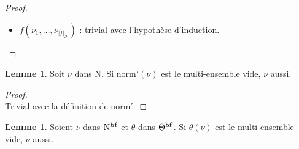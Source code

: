 \documentclass[a4paper]{report}
\newenvironment{preuve} 
  {\begin{proof}~\\} 
  {\end{proof}}
\theoremstyle{definition}
\newtheorem{lemme}[theoreme]{Lemme}
\newcommand{\norm}{\mathrm{norm}}
\newcommand{\F}{\mathscr{F}}
\newcommand{\N}{\mathrm{N}}
\begin{document}
\begin{preuve}
\begin{itemize}[label={\textbf{Cas}}]
      Par hypothèse d'induction, $\hat\theta (\nu)$ est bien formée.
      \begin{itemize}[label={\textbf{Si}}]
        \item
          $\hat\theta (\nu) = {\nu^\#}' \rightarrow \nu'$ : \\
          $\hat\theta (\nu^\#)$ étant bien formé, ${\nu^\#}'$ est presque bien formé, $\nu'$ est bien formé et n'est pas une flèche. \\
          Par le lemme \ref{pbf_implique_msomme_pbf}, la somme de $\hat\theta (\nu^\#)$ et ${\nu^\#}'$ est presque bien formée. \\
          On en déduit le résultat attendu.
        \item
          non : trivial.
      \end{itemize}
    \item
      $f (\nu_1, \dots, \nu_{|f|_\F})$ : trivial avec l'hypothèse d'induction.
  \end{itemize}
\end{preuve}

\begin{lemme} \label{norm'_vide_implique_vide}
  Soit $\nu$ dans $\N$. Si $\norm' (\nu)$ est le multi-ensemble vide, $\nu$ aussi.
\end{lemme}

\begin{preuve}
  Trivial avec la définition de $\norm'$.
\end{preuve}

\begin{lemme} \label{bf_et_subst_vide_implique_vide}
  Soient $\nu$ dans $\N^{\bold{bf}}$ et $\theta$ dans $\Theta^{\bold{bf}}$. Si $\hat\theta (\nu)$ est le multi-ensemble vide, $\nu$ aussi.
\end{lemme}
\end{document}
